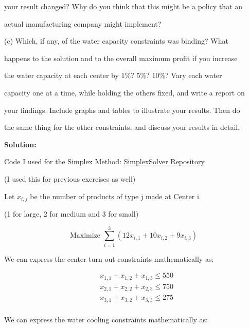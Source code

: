 \documentclass{article}
\begin{document}
your result changed? Why do you think that this might be a policy that an 

actual manufacturing company might implement?

\vspace{\baselineskip}

(c) Which, if any, of the water capacity constraints was binding? What 

happens to the solution and to the overall maximum profit if you increase 

the water capacity at each center by 1\%? 5\%? 10\%? Vary each water

capacity one at a time, while holding the others fixed, and write a report on 

your findings. Include graphs and tables to illustrate your results. Then do 

the same thing for the other constraints, and discuss your results in detail.

\vspace{\baselineskip}

\textbf{Solution:}

Code I used for the Simplex Method: \href{https://github.com/MichaelStott/SimplexSolver}{SimplexSolver Repository} 

(I used this for previous exercises as well)

\vspace{\baselineskip}

Let $x_{i,j}$  be the number of products of type j made at Center i. 

(1 for large, 2 for medium and 3 for small)

\[
\text{Maximize } \sum_{i=1}^{3} (12x_{i,1} + 10x_{i,2} + 9x_{i,3})
\]

We can express the center turn out constraints mathematically as:

\vspace{\baselineskip}

\[
\begin{aligned}
    & x_{1,1} + x_{1,2} + x_{1,3} \leq 550 \\
    & x_{2,1} + x_{2,2} + x_{2,3} \leq 750 \\
    & x_{3,1} + x_{3,2} + x_{3,3} \leq 275 \\
\end{aligned}
\]

\vspace{\baselineskip}

We can express the water cooling constraints mathematically as:
\end{document}
